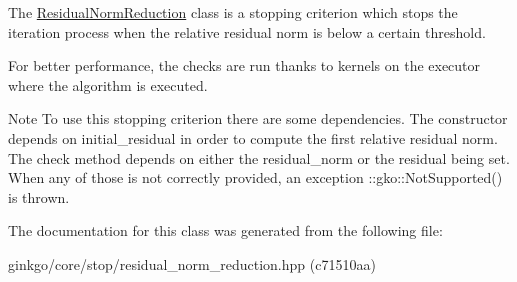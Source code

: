 The \hyperlink{classgko_1_1stop_1_1ResidualNormReduction}{Residual\+Norm\+Reduction} class is a stopping criterion which stops the iteration process when the relative residual norm is below a certain threshold. 

For better performance, the checks are run thanks to kernels on the executor where the algorithm is executed.

\begin{DoxyNote}{Note}
To use this stopping criterion there are some dependencies. The constructor depends on {\ttfamily initial\+\_\+residual} in order to compute the first relative residual norm. The check method depends on either the {\ttfamily residual\+\_\+norm} or the {\ttfamily residual} being set. When any of those is not correctly provided, an exception \+::gko\+::\+Not\+Supported() is thrown. 
\end{DoxyNote}


The documentation for this class was generated from the following file\+:\begin{DoxyCompactItemize}
\item 
ginkgo/core/stop/residual\+\_\+norm\+\_\+reduction.\+hpp (c71510aa)\end{DoxyCompactItemize}
